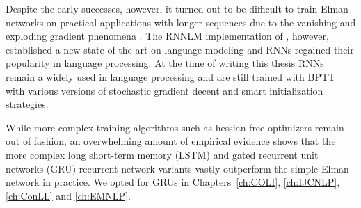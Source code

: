 Despite the early successes, however, it turned out to be difficult to train
Elman networks on practical applications with longer sequences
due to the vanishing and exploding gradient phenomena \citep{bengio1994learning}.
The RNNLM implementation of \cite{mikolov2010recurrent}, however,
established a new state-of-the-art on language modeling and RNNs regained their popularity
in language processing.  At the time of writing this thesis RNNs remain a widely used in language processing
and are still trained with BPTT with various versions of stochastic gradient decent and smart initialization
strategies. 

While more complex training algorithms such as hessian-free optimizers
\citep{martens2011learning} remain out of fashion,
an overwhelming amount of empirical evidence
shows that the more complex long short-term
memory (LSTM) \citep{hochreiter1997long,gers1999learning}
and gated recurrent unit networks (GRU) \citep{Cho2014}  recurrent network variants
vastly outperform the simple Elman network in practice. We opted for GRUs in
Chapters~\ref{ch:COLI}, \ref{ch:IJCNLP}, \ref{ch:ConLL} and \ref{ch:EMNLP}.







